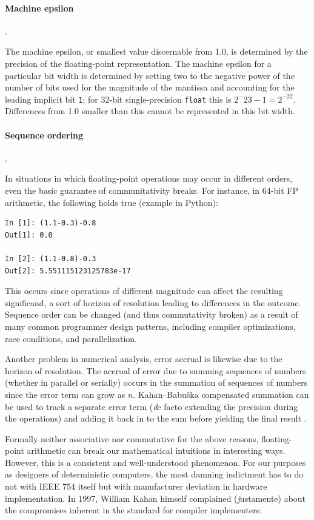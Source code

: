 \documentclass[twoside]{article}
\begin{document}
\paragraph{Machine epsilon}.

The machine epsilon, or smallest value discernable from 1.0, is determined by the precision of the floating-point representation.  The machine epsilon for a particular bit width is determined by setting two to the negative power of the number of bits used for the magnitude of the mantissa and accounting for the leading implicit bit \texttt{1}; for 32-bit single-precision \texttt{float} this is $2^-{23-1} = 2^{-22}$.  Differences from 1.0 smaller than this cannot be represented in this bit width.

\paragraph{Sequence ordering}.

In situations in which floating-point operations may occur in different orders, even the basic guarantee of communitativity breaks.  For instance, in 64-bit FP arithmetic, the following holds true (example in Python):

\lstset{language=Python}
\begin{lstlisting}
In [1]: (1.1-0.3)-0.8
Out[1]: 0.0

In [2]: (1.1-0.8)-0.3
Out[2]: 5.551115123125783e-17
\end{lstlisting}

This occurs since operations of different magnitude can affect the resulting significand, a sort of horizon of resolution leading to differences in the outcome.  Sequence order can be changed (and thus commutativity broken) as a result of many common programmer design patterns, including compiler optimizations, race conditions, and parallelization.

Another problem in numerical analysis, error accrual is likewise due to the horizon of resolution.  The accrual of error due to summing sequences of numbers (whether in parallel or serially) occurs in the summation of sequences of numbers since the error term can grow as $n$.  Kahan–Babuška compensated summation can be used to track a separate error term ({\emph de facto} extending the precision during the operations) and adding it back in to the sum before yielding the final result \citep{Kahan1965,Babuska1969}.

Formally neither associative nor commutative for the above reasons, floating-point arithmetic can break our mathematical intuitions in interesting ways.  However, this is a consistent and well-understood phenomenon.  For our purposes as designers of deterministic computers, the most damning indictment has to do not with IEEE 754 itself but with manufacturer deviation in hardware implementation.  In 1997, William Kahan himself complained ({\emph justamente}) about the compromises inherent in the standard for compiler implementers:
\end{document}
